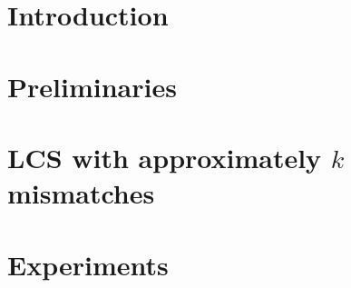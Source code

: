 \section{Introduction}\label{lcs:sec:intro}
	
\section{Preliminaries}\label{lcs:sec:prelim}

\section{LCS with approximately \texorpdfstring{$k$}{k} mismatches}\label{lcs:sec:klcs}


\section{Experiments}\label{lcs:sec:implem}

\BiblatexSplitbibDefernumbersWarningOff

\backmatter
\printbibliography[segment=\therefsegment,heading=subbibintoc]
